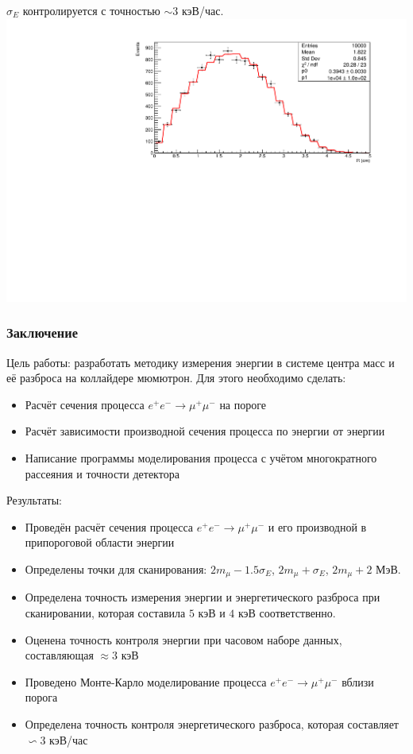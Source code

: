 \documentclass[10pt, pdf, hyperref={unicode}]{beamer}
\begin{document}
\begin{frame}

	\centering
	$\sigma_E$ контролируется с точностью $\sim 3$ кэВ/час.
	\includegraphics[height = 0.8\textheight]{res.pdf}
	\par
\end{frame}

\begin{frame}
	\frametitle{Заключение}
	\fontsize{8pt}{7.2}\selectfont
	Цель работы: разработать методику измерения энергии в системе центра масс и её разброса на коллайдере мюмютрон.
	Для этого необходимо сделать:
	\begin{itemize}
		\item Расчёт сечения процесса $e^+e^- \rightarrow \mu^+\mu^-$ на пороге
		\item Расчёт зависимости производной сечения процесса по энергии от энергии
		\item Написание программы моделирования процесса с учётом многократного рассеяния и точности детектора 
	\end{itemize}
	Результаты:
	\begin{itemize}
		\item Проведён расчёт сечения процесса $e^+e^- \rightarrow \mu^+\mu^-$ и его производной в припороговой области энергии
		\item Определены точки для сканирования: $2m_{\mu} - 1.5\sigma_E$, $2m_{\mu} + \sigma_E$, $2m_{\mu} + 2\text{ МэВ}$.
		\item Определена точность измерения энергии и энергетического разброса при сканировании, 
			которая составила $5$ кэВ и $4$ кэВ соответственно.
		\item Оценена точность контроля энергии при часовом наборе данных, составляющая $\approx 3$ кэВ 
		\item Проведено Монте-Карло моделирование процесса $e^+e^- \rightarrow \mu^+\mu^-$ вблизи порога
		\item Определена точность контроля энергетического разброса, которая составляет $\backsim 3$ кэВ/час
	\end{itemize}

\end{frame}
\end{document}
